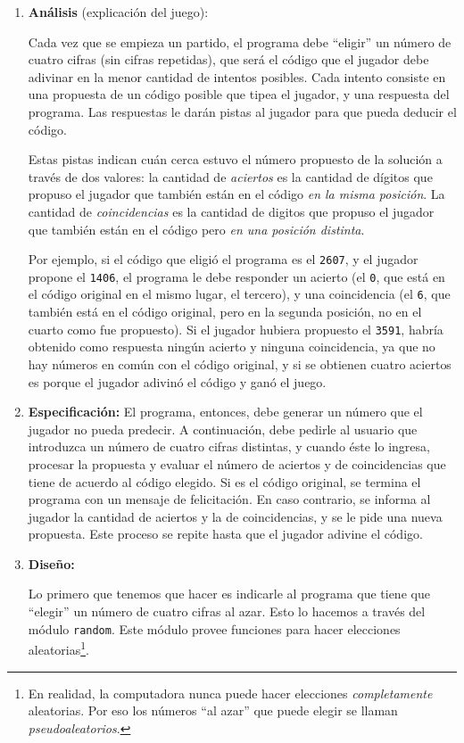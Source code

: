 \begin{enumerate}

\item {\bf Análisis } (explicación del juego):

Cada vez que se empieza un partido, el programa debe ``eligir'' un número de
cuatro cifras (sin cifras repetidas), que será el código que el jugador debe
adivinar en la menor cantidad de intentos posibles. Cada intento consiste en
una propuesta de un código posible que tipea el jugador, y una respuesta del
programa. Las respuestas le darán pistas al jugador para que pueda deducir el
código.

Estas pistas indican cuán cerca estuvo el número propuesto de la solución a
través de dos valores: la cantidad de \emph{aciertos} es la cantidad de
dígitos que propuso el jugador que también están en el código \emph{en la
misma posición}. La cantidad de \emph{coincidencias} es la cantidad de
digitos que propuso el jugador que también están en el código pero \emph{en
una posición distinta}.

Por ejemplo, si el código que eligió el programa es el \lstinline!2607!, y el
jugador propone el \lstinline!1406!, el programa le debe responder un acierto (el
\lstinline!0!, que está en el código original en el mismo lugar, el tercero), y
una coincidencia (el \lstinline!6!, que también está en el código original, pero
en la segunda posición, no en el cuarto como fue propuesto). Si el jugador
hubiera propuesto el \lstinline!3591!, habría obtenido como respuesta ningún
acierto y ninguna coincidencia, ya que no hay números en común con el
código original, y si se obtienen cuatro aciertos es porque el jugador
adivinó el código y ganó el juego.

\item {\bf Especificación: }
El programa, entonces, debe generar un número que el jugador no pueda predecir.
A continuación, debe pedirle al usuario que introduzca un número de cuatro
cifras distintas, y cuando éste lo ingresa, procesar la propuesta y evaluar el
número de aciertos y de coincidencias que tiene de acuerdo al código elegido. Si
es el código original, se termina el programa con un mensaje de felicitación. En
caso contrario, se informa al jugador la cantidad de aciertos y la de
coincidencias, y se le pide una nueva propuesta. Este proceso se repite hasta
que el jugador adivine el código.

\item {\bf Diseño:}
\label{str:disenno}

Lo primero que tenemos que hacer es indicarle al programa que tiene que
``elegir'' un número de cuatro cifras al azar. Esto lo hacemos a través del
módulo \lstinline!random!. Este módulo provee funciones para hacer elecciones
aleatorias\footnote{En realidad, la computadora nunca puede hacer
elecciones \emph{completamente} aleatorias. Por eso los números ``al azar''
que puede elegir se llaman \emph{pseudoaleatorios}.}.


\end{enumerate}
